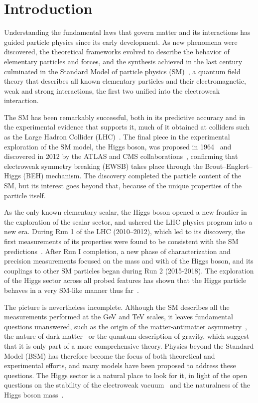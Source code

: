 \chapter*{Introduction}
%
\noindent
%
\noindent Understanding the fundamental laws that govern matter and its interactions has guided particle physics since its early development. As new phenomena were discovered, the theoretical frameworks evolved to describe the behavior of elementary particles and forces, and the synthesis achieved in the last century culminated in the Standard Model of particle physics (SM)~\cite{Glashow:1961tr,Weinberg:1967tq,Salam:1968rm}, a quantum field theory that describes all known elementary particles and their electromagnetic, weak and strong interactions, the first two unified into the electroweak interaction.

The SM has been remarkably successful, both in its predictive accuracy and in the experimental evidence that supports it, much of it obtained at colliders such as the Large Hadron Collider (LHC)~\cite{Evans:2008zzb}. The final piece in the experimental exploration of the SM model, the Higgs boson, was proposed in 1964~\cite{Englert:1964et,Higgs:1964ia,Higgs:1964pj,Guralnik:1964eu} and discovered in 2012 by the ATLAS and CMS collaborations~\cite{ATLAS:2012yve,CMS:2012qbp,CMS:2013btf}, confirming that electroweak symmetry breaking (EWSB) takes place through the Brout--Englert--Higgs (BEH) mechanism. The discovery completed the particle content of the SM, but its interest goes beyond that, because of the unique properties of the particle itself.

As the only known elementary scalar, the Higgs boson opened a new frontier in the exploration of the scalar sector, and ushered the LHC physics program into a new era. During Run 1 of the LHC (2010--2012), which led to its discovery, the first measurements of its properties were found to be consistent with the SM predictions~\cite{ATLAS:2015yey,ATLAS:2016neq}. After Run I completion, a new phase of characterization and precision measurements focused on the mass and with of the Higgs boson, and its couplings to other SM particles began during Run 2 (2015-2018). The exploration of the Higgs sector across all probed features has shown that the Higgs particle behaves in a very SM-like manner thus far~\cite{CMS:2022dwd,ATLAS:2022vkf}.

The picture is nevertheless incomplete. Although the SM describes all the measurements performed at the GeV and TeV scales, it leaves fundamental questions unanswered, such as the origin of the matter-antimatter asymmetry~\cite{Sakharov:1967dj}, the nature of dark matter~\cite{Bertone:2004pz,Planck:2018vyg} or the quantum description of gravity, which suggest that it is only part of a more comprehensive theory. Physics beyond the Standard Model (BSM) has therefore become the focus of both theoretical and experimental efforts, and many models have been proposed to address these questions. The Higgs sector is a natural place to look for it, in light of the open questions on the stability of the electroweak vacuum~\cite{EliasMiro:2011aa} and the naturalness of the Higgs boson mass~\cite{tHooft:1979rat}.

